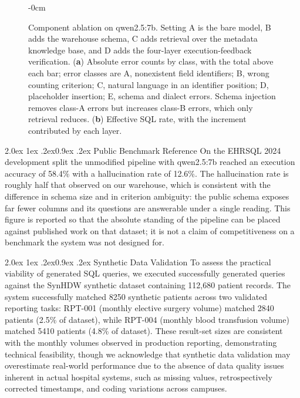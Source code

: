 \documentclass[10pt]{article}
\makeatletter
\renewcommand\subsection{\@startsection{subsection}{2}{\z@}%
  {2.0ex \@plus 1ex \@minus .2ex}{0.9ex \@plus .2ex}%
  {\normalfont\normalsize\bfseries}}
\newlength{\extralength}\setlength{\extralength}{0cm}
\makeatother
\begin{document}
\begin{figure}[!ht]
\begin{adjustwidth}{-\extralength}{0cm}
\caption{Component ablation on qwen2.5:7b. Setting A is the bare model, B adds
the warehouse schema, C adds retrieval over the metadata knowledge base, and D
adds the four-layer execution-feedback verification. (\textbf{a}) Absolute error
counts by class, with the total above each bar; error classes are A, nonexistent
field identifiers; B, wrong counting criterion; C, natural language in an
identifier position; D, placeholder insertion; E, schema and dialect errors.
Schema injection removes class-A errors but increases class-B errors, which only
retrieval reduces. (\textbf{b}) Effective SQL rate, with the increment
contributed by each layer.}
\label{fig:ablation}
\end{adjustwidth}
\end{figure}

\subsection{Public Benchmark Reference}\label{sec:bench}
On the EHRSQL 2024 development split the unmodified pipeline with qwen2.5:7b
reached an execution accuracy of 58.4\% with a hallucination rate of 12.6\%. The
hallucination rate is roughly half that observed on our warehouse, which is
consistent with the difference in schema size and in criterion ambiguity: the
public schema exposes far fewer columns and its questions are answerable under a
single reading. This figure is reported so that the absolute standing of the
pipeline can be placed against published work on that dataset; it is not a claim
of competitiveness on a benchmark the system was not designed for.

\subsection{Synthetic Data Validation}
To assess the practical viability of generated SQL queries, we executed
successfully generated queries against the SynHDW synthetic dataset containing
112,680 patient records. The system successfully matched 8250 synthetic patients
across two validated reporting tasks: RPT-001 (monthly elective surgery volume)
matched 2840 patients (2.5\% of dataset), while RPT-004 (monthly blood transfusion volume) matched 5410 patients (4.8\% of dataset). These result-set
sizes are consistent with the monthly volumes observed in production reporting,
demonstrating technical feasibility, though we acknowledge that synthetic data
validation may overestimate real-world performance due to the absence of data
quality issues inherent in actual hospital systems, such as missing values,
retrospectively corrected timestamps, and coding variations across campuses.
\end{document}
